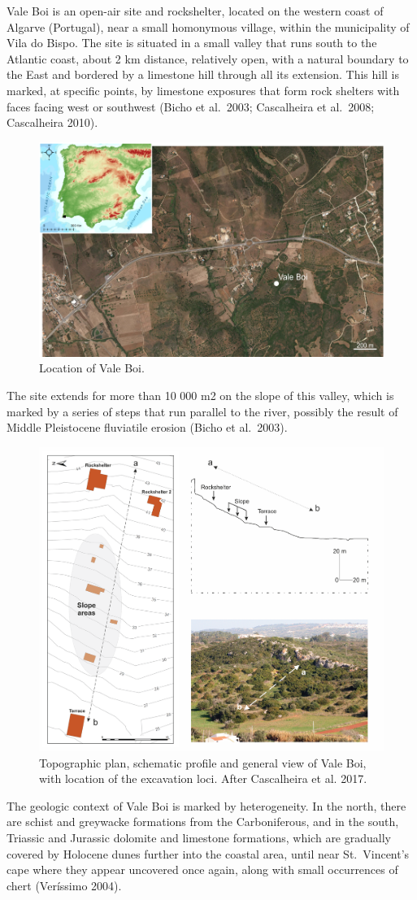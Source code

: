 \documentclass[12pt,twoside]{reedthesis}
\begin{document}
Vale Boi is an open-air site and rockshelter, located on the western coast of Algarve (Portugal), near a small homonymous village, within the municipality of Vila do Bispo. The site is situated in a small valley that runs south to the Atlantic coast, about 2 km distance, relatively open, with a natural boundary to the East and bordered by a limestone hill through all its extension. This hill is marked, at specific points, by limestone exposures that form rock shelters with faces facing west or southwest (Bicho et al.~2003; Cascalheira et al.~2008; Cascalheira 2010).
\begin{figure}

{\centering \includegraphics[width=0.5\linewidth]{figure/vale_boi_map} 

}

\caption{Location of Vale Boi.}\label{fig:vbmap}
\end{figure}
The site extends for more than 10 000 m2 on the slope of this valley, which is marked by a series of steps that run parallel to the river, possibly the result of Middle Pleistocene fluviatile erosion (Bicho et al.~2003).
\begin{figure}

{\centering \includegraphics[width=0.5\linewidth]{figure/vb_plan} 

}

\caption{Topographic plan, schematic profile and general view of Vale Boi, with location of the excavation loci. After Cascalheira et al. 2017.}\label{fig:vbphoto}
\end{figure}
The geologic context of Vale Boi is marked by heterogeneity. In the north, there are schist and greywacke formations from the Carboniferous, and in the south, Triassic and Jurassic dolomite and limestone formations, which are gradually covered by Holocene dunes further into the coastal area, until near St.~Vincent's cape where they appear uncovered once again, along with small occurrences of chert (Veríssimo 2004).
\end{document}

